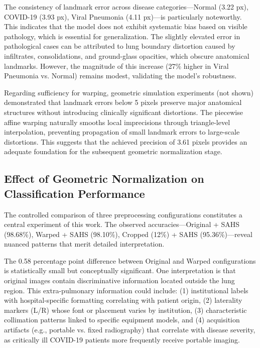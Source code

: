 \documentclass[applsci,article,submit,pdftex,moreauthors]{Definitions/mdpi}
\begin{document}
The consistency of landmark error across disease categories---Normal (3.22 px), COVID-19 (3.93 px), Viral Pneumonia (4.11 px)---is particularly noteworthy. This indicates that the model does not exhibit systematic bias based on visible pathology, which is essential for generalization. The slightly elevated error in pathological cases can be attributed to lung boundary distortion caused by infiltrates, consolidations, and ground-glass opacities, which obscure anatomical landmarks. However, the magnitude of this increase (27\% higher in Viral Pneumonia vs. Normal) remains modest, validating the model's robustness.

Regarding sufficiency for warping, geometric simulation experiments (not shown) demonstrated that landmark errors below 5 pixels preserve major anatomical structures without introducing clinically significant distortions. The piecewise affine warping naturally smooths local imprecisions through triangle-level interpolation, preventing propagation of small landmark errors to large-scale distortions. This suggests that the achieved precision of 3.61 pixels provides an adequate foundation for the subsequent geometric normalization stage.

\subsection{Effect of Geometric Normalization on Classification Performance}

The controlled comparison of three preprocessing configurations constitutes a central experiment of this work. The observed accuracies---Original + SAHS (98.68\%), Warped + SAHS (98.10\%), Cropped (12\%) + SAHS (95.36\%)---reveal nuanced patterns that merit detailed interpretation.

The 0.58 percentage point difference between Original and Warped configurations is statistically small but conceptually significant. One interpretation is that original images contain discriminative information located outside the lung region. This extra-pulmonary information could include: (1) institutional labels with hospital-specific formatting correlating with patient origin, (2) laterality markers (L/R) whose font or placement varies by institution, (3) characteristic collimation patterns linked to specific equipment models, and (4) acquisition artifacts (e.g., portable vs. fixed radiography) that correlate with disease severity, as critically ill COVID-19 patients more frequently receive portable imaging.
\end{document}
